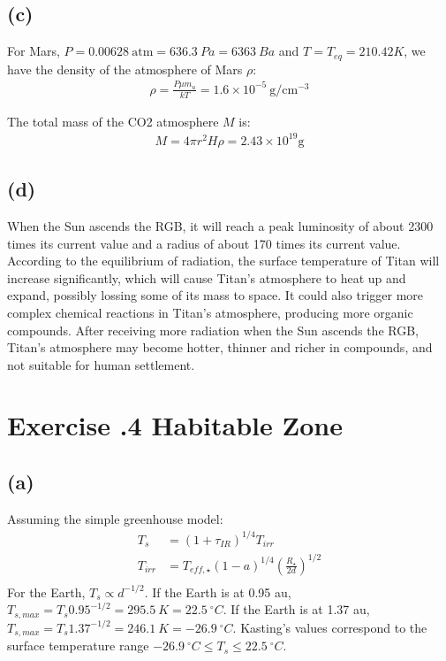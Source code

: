 \documentclass[a4paper,12pt]{article}
\newcommand{\cm}{\mathrm{cm}}
\newcommand{\g}{\mathrm{g}}
\begin{document}
\subsection*{(c)}
For Mars, $P=0.00628 \ \text{atm} = 636.3 \ Pa = 6363 \ Ba$ and 
$T=T_{eq} = 210.42 K$, we have the density of the atmosphere of Mars $\rho$:
\begin{align*}
    \rho = \frac{P \mu m_u}{kT} = 1.6 \times 10^{-5} \ \g / \cm^{-3}
\end{align*}

The total mass of the CO2 atmosphere $M$ is:
\begin{align*}
    M = 4\pi r^2 H \rho = 2.43 \times 10^{19} \g
\end{align*}

\subsection*{(d)}
When the Sun ascends the RGB, it will reach a peak luminosity of 
about 2300 times its current value and a radius of about 170 times its current value. 
According to the equilibrium of radiation, the surface temperature of 
Titan will increase significantly, which will cause Titan's atmosphere 
to heat up and expand, possibly lossing some of its mass to space.
It could also trigger more complex chemical reactions in Titan's atmosphere, 
producing more organic compounds. After receiving more radiation when the Sun ascends the RGB, Titan's 
atmosphere may become hotter, thinner and richer in compounds, 
and not suitable for human settlement.

\section*{\textbf{Exercise \uppercase\expandafter{}.4 Habitable Zone}}
\subsection*{(a)}
Assuming the simple greenhouse model:
\begin{align*}
    T_s &= (1+\tau_{IR})^{1/4} T_{irr} \\
    T_{irr} &= T_{eff, \star} (1-a)^{1/4} (\frac{R_\star}{2d})^{1/2} \\
\end{align*}
For the Earth, $T_s \propto d^{-1/2}$.
If the Earth is at 0.95 au, $T_{s, max} = T_s 0.95^{-1/2} = 295.5\ K =22.5 \ ^\circ C$.
If the Earth is at 1.37 au, $T_{s, max} = T_s 1.37^{-1/2} = 246.1\ K = -26.9 \ ^\circ C$.
Kasting's values correspond to the surface temperature range $-26.9 \ ^\circ C \leq T_s \leq 22.5 \ ^\circ C$.
\end{document}
